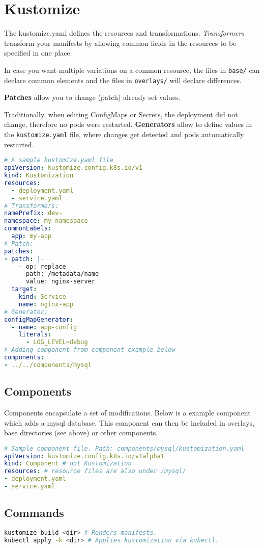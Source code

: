 \section{Kustomize}

The kustomize.yaml defines the resources and transformations. \textit{Transformers} transform your manifests by allowing common fields in the resources to be specified in one place.

In case you want multiple variations on a common resource, the files in \texttt{base/} can declare common elements and the files in \texttt{overlays/} will declare differences.

\textbf{Patches} allow you to change (patch) already set values.

Traditionally, when editing ConfigMaps or Secrets, the deployment did not change, therefore no pods were restarted. \textbf{Generators} allow to define values in the \texttt{kustomize.yaml} file, where changes get detected and pods automatically restarted.
\begin{lstlisting}[language=yaml]
# A sample kustomize.yaml file
apiVersion: kustomize.config.k8s.io/v1
kind: Kustomization
resources:
  - deployment.yaml
  - service.yaml
# Transformers:
namePrefix: dev-
namespace: my-namespace
commonLabels:
  app: my-app
# Patch:
patches:
- patch: |-
    - op: replace
      path: /metadata/name
      value: nginx-server
  target:
    kind: Service
    name: nginx-app
# Generator:
configMapGenerator:
  - name: app-config
    literals:
      - LOG_LEVEL=debug
# Adding component from component example below
components:
- ../../components/mysql
\end{lstlisting}

\subsection{Components}

Components encapsulate a set of modifications. Below is a example component which adds a mysql database. This component can then be included in overlays, base directories (see above) or other components.

\begin{lstlisting}[language=yaml]
# Sample component file. Path: components/mysql/kustomization.yaml
apiVersion: kustomize.config.k8s.io/v1alpha1
kind: Component # not Kustomization
resources: # resource files are also under /mysql/
- deployment.yaml
- service.yaml
\end{lstlisting}

\subsection{Commands}

\begin{lstlisting}[language=sh]
kustomize build <dir> # Renders manifests.
kubectl apply -k <dir> # Applies kustomization via kubectl.
\end{lstlisting}
